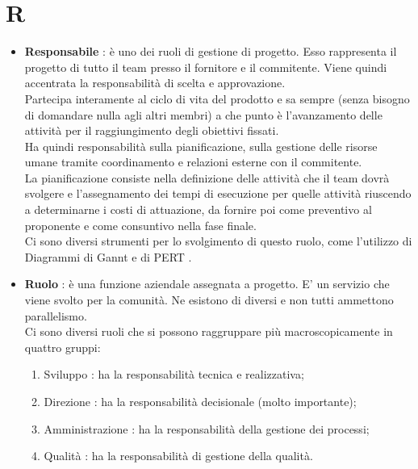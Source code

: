 % 
%
% 
%

\section{R}

\begin{itemize}
	\item \textbf{Responsabile} : è uno dei ruoli di gestione di progetto. Esso rappresenta il progetto di tutto il team presso il fornitore e il commitente. Viene quindi accentrata la responsabilità di scelta e approvazione. \\
Partecipa interamente al ciclo di vita del prodotto e sa sempre (senza bisogno di domandare nulla agli altri membri) a che punto è l'avanzamento delle attività per il raggiungimento degli obiettivi fissati. \\
Ha quindi responsabilità sulla pianificazione, sulla gestione delle risorse umane tramite coordinamento e relazioni esterne con il commitente. \\
La pianificazione consiste nella definizione delle attività che il team dovrà svolgere e l'assegnamento dei tempi di esecuzione per quelle attività riuscendo a determinarne i costi di attuazione, da fornire poi come preventivo al proponente e come consuntivo nella fase finale. \\
Ci sono diversi strumenti per lo svolgimento di questo ruolo, come l'utilizzo di Diagrammi di Gannt e di PERT .

	\item \textbf{Ruolo} : è una funzione aziendale assegnata a progetto. E' un servizio che viene svolto per la comunità. Ne esistono di diversi e non tutti ammettono parallelismo. \\
Ci sono diversi ruoli che si possono raggruppare più macroscopicamente in quattro gruppi:
	\begin{enumerate}
		\item Sviluppo : ha la responsabilità tecnica e realizzativa;
		\item Direzione : ha la responsabilità decisionale (molto importante);
		\item Amministrazione : ha la responsabilità della gestione dei processi;
		\item Qualità : ha la responsabilità di gestione della qualità.
	\end{enumerate}


\end{itemize}
